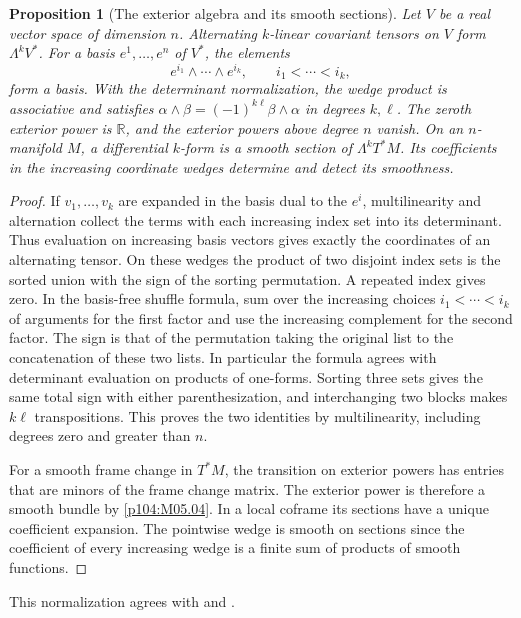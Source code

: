\documentclass[11pt,oneside,openany]{book}
\newtheorem{proposition}[theorem]{Proposition}
\theoremstyle{definition}
\theoremstyle{remark}
\newcommand{\R}{\mathbb R}
\begin{document}
\begin{proposition}[The exterior algebra and its smooth sections]
\label{p104:M07.01}
Let \(V\) be a real vector space of dimension \(n\). Alternating \(k\)-linear covariant tensors on \(V\) form \(\Lambda^kV^*\). For a basis \(e^1,\ldots,e^n\) of \(V^*\), the elements
\[
 e^{i_1}\wedge\cdots\wedge e^{i_k},\qquad i_1<\cdots<i_k,
\]
form a basis. With the determinant normalization, the wedge product is associative and satisfies \(\alpha\wedge\beta=(-1)^{k\ell}\beta\wedge\alpha\) in degrees \(k,\ell\). The zeroth exterior power is \(\R\), and the exterior powers above degree \(n\) vanish. On an \(n\)-manifold \(M\), a differential \(k\)-form is a smooth section of \(\Lambda^kT^*M\). Its coefficients in the increasing coordinate wedges determine and detect its smoothness.
\end{proposition}

\begin{proof}
If \(v_1,\ldots,v_k\) are expanded in the basis dual to the \(e^i\), multilinearity and alternation collect the terms with each increasing index set into its determinant. Thus evaluation on increasing basis vectors gives exactly the coordinates of an alternating tensor. On these wedges the product of two disjoint index sets is the sorted union with the sign of the sorting permutation. A repeated index gives zero. In the basis-free shuffle formula, sum over the increasing choices \(i_1<\cdots<i_k\) of arguments for the first factor and use the increasing complement for the second factor. The sign is that of the permutation taking the original list to the concatenation of these two lists. In particular the formula agrees with determinant evaluation on products of one-forms. Sorting three sets gives the same total sign with either parenthesization, and interchanging two blocks makes \(k\ell\) transpositions. This proves the two identities by multilinearity, including degrees zero and greater than \(n\).

For a smooth frame change in \(T^*M\), the transition on exterior powers has entries that are minors of the frame change matrix. The exterior power is therefore a smooth bundle by \cref{p104:M05.04}. In a local coframe its sections have a unique coefficient expansion. The pointwise wedge is smooth on sections since the coefficient of every increasing wedge is a finite sum of products of smooth functions.
\end{proof}

This normalization agrees with \cite[Chapter 14, especially Proposition 14.11]{lee} and \cite[Sections 3 and 18]{tu}.
\end{document}
